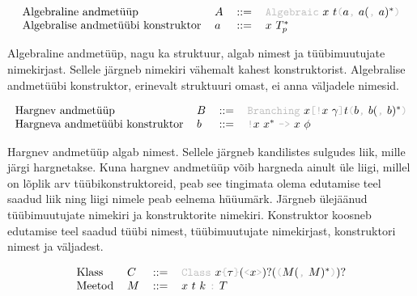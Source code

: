 \documentclass[12pt]{article}
\begin{document}
      \begin{equation*}
        \begin{tabular}{llll}
          Algebraline andmetüüp              & $A$ & $::=$ & {\color{helehall}\verb!Algebraic!} $x$ $t${\color{helehall}\verb!(!}$a${\color{helehall}\verb!,!} $a(${\color{helehall}\verb!,!} $a)^*${\color{helehall}\verb!)!} \\
          Algebralise andmetüübi konstruktor & $a$ & $::=$ & $x$ $T_p^*$
        \end{tabular}
      \end{equation*}

      Algebraline andmetüüp, nagu ka struktuur, algab nimest ja tüübimuutujate nimekirjast. Sellele järgneb nimekiri vähemalt kahest konstruktorist. Algebralise andmetüübi konstruktor, erinevalt struktuuri omast, ei anna väljadele nimesid.

      \begin{equation*}
        \begin{tabular}{llll}
          Hargnev andmetüüp               & $B$ & $::=$ & {\color{helehall}\verb!Branching!} $x${\color{helehall}\verb"[!"}$x$ $\gamma${\color{helehall}\verb!]!}$t${\color{helehall}\verb!(!}$b${\color{helehall}\verb!,!} $b(${\color{helehall}\verb!,!} $b)^*${\color{helehall}\verb!)!} \\
          Hargneva andmetüübi konstruktor & $b$ & $::=$ & {\color{helehall}\verb"!"}$x$ $x^*$ {\color{helehall}\verb!->!} $x$ $\phi$
        \end{tabular}
      \end{equation*}

      Hargnev andmetüüp algab nimest. Sellele järgneb kandilistes sulgudes liik, mille järgi hargnetakse. Kuna hargnev andmetüüp võib hargneda ainult üle liigi, millel on lõplik arv tüübikonstruktoreid, peab see tingimata olema edutamise teel saadud liik ning liigi nimele peab eelnema hüüumärk. Järgneb ülejäänud tüübimuutujate nimekiri ja konstruktorite nimekiri. Konstruktor koosneb edutamise teel saadud tüübi nimest, tüübimuutujate nimekirjast, konstruktori nimest ja väljadest.

      \begin{equation*}
        \begin{tabular}{llll}
          Klass  & $C$ & $::=$ & {\color{helehall}\verb!Class!} $x${\color{helehall}\verb!{!}$\tau${\color{helehall}\verb!}!}$(${\color{helehall}\verb!<!}$x${\color{helehall}\verb!>!}$)?(${\color{helehall}\verb!(!}$M(${\color{helehall}\verb!,!} $M)^*${\color{helehall}\verb!)!}$)?$ \\
          Meetod & $M$ & $::=$ & $x$ $t$ $k$ {\color{helehall}\verb!:!} $T$
        \end{tabular}
      \end{equation*}
\end{document}

